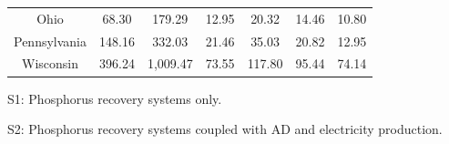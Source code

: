 \documentclass[authoryear]{elsarticle}
\begin{document}
\begin{table}[h]
\begin{threeparttable}
\begin{tabular}{@{}ccccccc@{}}
				Ohio                   & 68.30                                       & 179.29                                      & 12.95                                         & 20.32                                        & 14.46                                                          & 10.80                                                          \\
				Pennsylvania           & 148.16                                       & 332.03                                      & 21.46                                        & 35.03                                       & 20.82                                                          & 12.95                                                          \\
				Wisconsin              & 396.24                                      & 1,009.47                                      & 73.55                                        & 117.80                                        & 95.44                                                          & 74.14                                                         \\ \bottomrule
		\end{tabular}
		\begin{tablenotes}
			\item S1: Phosphorus recovery systems only.
			\item S2: Phosphorus recovery systems coupled with AD and electricity production.
		\end{tablenotes}
	\end{threeparttable}
\end{table}




 
\end{document}
